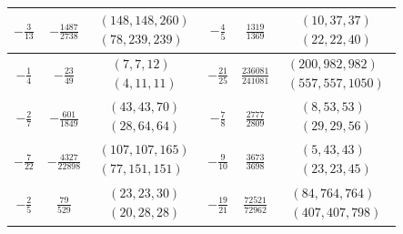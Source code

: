 \documentclass[11pt]{amsart}
\theoremstyle{plain}
\theoremstyle{remark}
\theoremstyle{plain}
\begin{document}
\begin{table}[H]
\begin{tabular}{c|c|c||c|c|c}
$-\frac{3}{13}$ &
$-\frac{1487}{2738}$ &
$\begin{array}{c}
(148,148,260)\\
(78,239,239)
\end{array}$
&
$-\frac{4}{5}$ &
$\frac{1319}{1369}$ &
$\begin{array}{c}
(10,37,37)\\
(22,22,40)
\end{array}$
\\
\hline

$-\frac{1}{4}$ &
$-\frac{23}{49}$ &
$\begin{array}{c}
(7,7,12)\\
(4,11,11)
\end{array}$
&
$-\frac{21}{25}$ &
$\frac{236081}{241081}$ &
$\begin{array}{c}
(200,982,982)\\
(557,557,1050)
\end{array}$
\\
\hline

$-\frac{2}{7}$ &
$-\frac{601}{1849}$ &
$\begin{array}{c}
(43,43,70)\\
(28,64,64)
\end{array}$
&
$-\frac{7}{8}$ &
$\frac{2777}{2809}$ &
$\begin{array}{c}
(8,53,53)\\
(29,29,56)
\end{array}$
\\
\hline

$-\frac{7}{22}$ &
$-\frac{4327}{22898}$ &
$\begin{array}{c}
(107,107,165)\\
(77,151,151)
\end{array}$
&
$-\frac{9}{10}$ &
$\frac{3673}{3698}$ &
$\begin{array}{c}
(5,43,43)\\
(23,23,45)
\end{array}$
\\
\hline

$-\frac{2}{5}$ &
$\frac{79}{529}$ &
$\begin{array}{c}
(23,23,30)\\
(20,28,28)
\end{array}$
&
$-\frac{19}{21}$ &
$\frac{72521}{72962}$ &
$\begin{array}{c}
(84,764,764)\\
(407,407,798)
\end{array}$
\\
\hline


\end{tabular}
\end{table}
\end{document}
